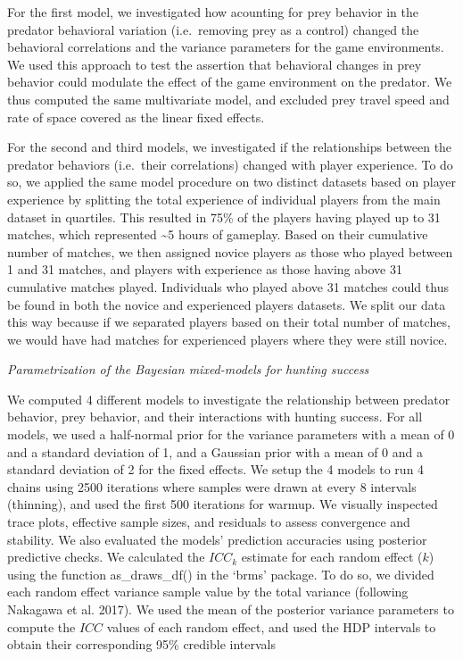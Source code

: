 \documentclass[
  11pt,
]{article}
\begin{document}
For the first model, we investigated how acounting for prey behavior in
the predator behavioral variation (i.e.~removing prey as a control)
changed the behavioral correlations and the variance parameters for the
game environments. We used this approach to test the assertion that
behavioral changes in prey behavior could modulate the effect of the
game environment on the predator. We thus computed the same multivariate
model, and excluded prey travel speed and rate of space covered as the
linear fixed effects.

For the second and third models, we investigated if the relationships
between the predator behaviors (i.e.~their correlations) changed with
player experience. To do so, we applied the same model procedure on two
distinct datasets based on player experience by splitting the total
experience of individual players from the main dataset in quartiles.
This resulted in 75\% of the players having played up to 31 matches,
which represented \textasciitilde5 hours of gameplay. Based on their
cumulative number of matches, we then assigned novice players as those
who played between 1 and 31 matches, and players with experience as
those having above 31 cumulative matches played. Individuals who played
above 31 matches could thus be found in both the novice and experienced
players datasets. We split our data this way because if we separated
players based on their total number of matches, we would have had
matches for experienced players where they were still novice.

\begin{center}
\emph{Parametrization of the Bayesian mixed-models for hunting success}
\end{center}

We computed 4 different models to investigate the relationship between
predator behavior, prey behavior, and their interactions with hunting
success. For all models, we used a half-normal prior for the variance
parameters with a mean of 0 and a standard deviation of 1, and a
Gaussian prior with a mean of 0 and a standard deviation of 2 for the
fixed effects. We setup the 4 models to run 4 chains using 2500
iterations where samples were drawn at every 8 intervals (thinning), and
used the first 500 iterations for warmup. We visually inspected trace
plots, effective sample sizes, and residuals to assess convergence and
stability. We also evaluated the models' prediction accuracies using
posterior predictive checks. We calculated the \(ICC_k\) estimate for
each random effect (\(k\)) using the function as\_draws\_df() in the
`brms' package. To do so, we divided each random effect variance sample
value by the total variance (following Nakagawa et al. 2017). We used
the mean of the posterior variance parameters to compute the \(ICC\)
values of each random effect, and used the HDP intervals to obtain their
corresponding 95\% credible intervals
\end{document}
